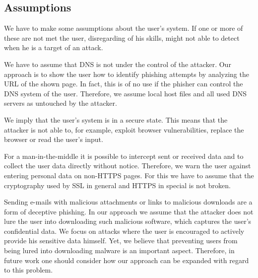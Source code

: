 \subsection{Assumptions}
\label{s:assumptions}
We have to make some assumptions about the user's system. 
If one or more of these are not met the user, disregarding of his skills, might not able to detect when he is a target of an attack.
\begin{description}[leftmargin=0cm]
	\item[Secure DNS] We have to assume that DNS is not under the control of the attacker.
	Our approach is to show the user how to identify phishing attempts by analyzing the URL of the shown page.
	In fact, this is of no use if the phisher can control the DNS system of the user.
	Therefore, we assume local host files and all used DNS servers as untouched by the attacker.
	\item[Secure Smartphone] We imply that the user's system is in a secure state.
	This means that the attacker is not able to, for example, exploit browser vulnerabilities, replace the browser or read the user's input.
	\item[Secure SSL] 
	For a man-in-the-middle it is possible to intercept sent or received data and to collect the user data directly without notice.
	Therefore, we warn the user against entering personal data on non-HTTPS pages.
	For this we have to assume that the cryptography used by SSL in general and HTTPS in special is not broken.
	\item[Malware] 
	Sending e-mails with malicious attachments or links to malicious downloads are a form of deceptive phishing.
	In our approach we assume that the attacker does not lure the user into downloading such malicious software, which captures the user's confidential data.
	We focus on attacks where the user is encouraged to actively provide his sensitive data himself.
	Yet, we believe that preventing users from being lured into downloading malware is an important aspect.
	Therefore, in future work one should consider how our approach can be expanded with regard to this problem.
	
\end{description}

